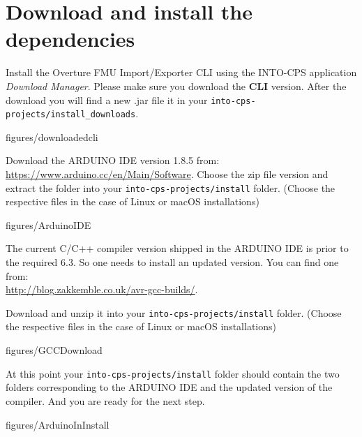 \documentclass[11pt,a4paper]{../tutorial}
\begin{document}
\newpage
\section{Download and install the dependencies}


\begin{instructions} 

\item Install the Overture FMU Import/Exporter CLI using the INTO-CPS
	application \emph{Download Manager}. Please make sure you download the
	\textbf{CLI} version. After the download you will find a new .jar file it in your \texttt{into-cps-projects/install\_downloads}. 
	
	\begin{annotation}[width=0.85\linewidth]{figures/downloadedcli}
	\end{annotation}

	\newpage
\item Download the ARDUINO IDE version 1.8.5 from:\\
	\url{https://www.arduino.cc/en/Main/Software}.  Choose the zip file
	version and extract the folder into your
	\texttt{into-cps-projects/install} folder. (Choose the respective files in the case of Linux or macOS installations)

	\begin{annotation}[width=0.85\linewidth, trim= {0 6cm 0 0},clip]{figures/ArduinoIDE}
	\end{annotation}


\item The current C/C++ compiler version shipped in the ARDUINO IDE is prior to the required 6.3. So one needs to install an updated version. You can find one from:\\
	\url{http://blog.zakkemble.co.uk/avr-gcc-builds/}. 
	
	Download and unzip it into your  \texttt{into-cps-projects/install} folder. (Choose the respective files in the case of Linux or macOS installations)


	\begin{annotation}[width=0.85\linewidth, trim= {0 6cm 0 0},clip]{figures/GCCDownload}
	\end{annotation}

\newpage
\item At this point your \texttt{into-cps-projects/install} folder should contain the two folders corresponding to the ARDUINO IDE and the updated version of the compiler. And you are ready for the next step. 

	\begin{annotation}[width=0.85\linewidth]{figures/ArduinoInInstall}
	\end{annotation}
\newpage
\end{instructions}
\end{document}
